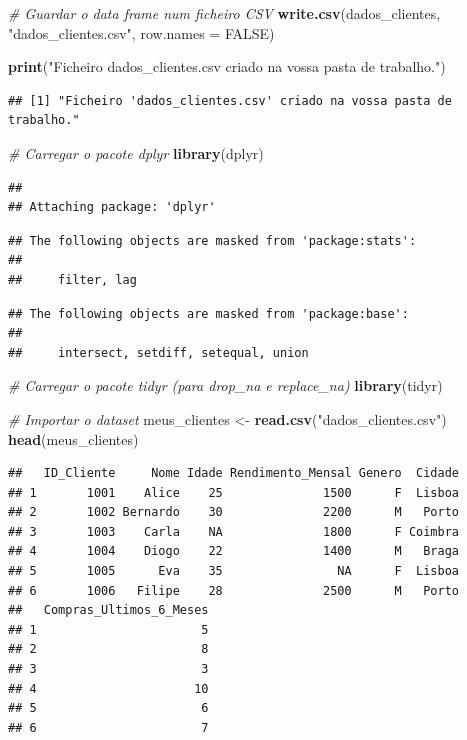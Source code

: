 \documentclass[
]{article}
\newenvironment{Shaded}{\begin{snugshade}}{\end{snugshade}}
\newcommand{\AttributeTok}[1]{\textcolor[rgb]{0.13,0.29,0.53}{#1}}
\newcommand{\CommentTok}[1]{\textcolor[rgb]{0.56,0.35,0.01}{\textit{#1}}}
\newcommand{\ConstantTok}[1]{\textcolor[rgb]{0.56,0.35,0.01}{#1}}
\newcommand{\FunctionTok}[1]{\textcolor[rgb]{0.13,0.29,0.53}{\textbf{#1}}}
\newcommand{\NormalTok}[1]{#1}
\newcommand{\OtherTok}[1]{\textcolor[rgb]{0.56,0.35,0.01}{#1}}
\newcommand{\StringTok}[1]{\textcolor[rgb]{0.31,0.60,0.02}{#1}}
\begin{document}
\begin{Shaded}
\begin{Highlighting}[]
\CommentTok{\# Guardar o data frame num ficheiro CSV}
\FunctionTok{write.csv}\NormalTok{(dados\_clientes, }\StringTok{"dados\_clientes.csv"}\NormalTok{, }\AttributeTok{row.names =} \ConstantTok{FALSE}\NormalTok{)}

\FunctionTok{print}\NormalTok{(}\StringTok{"Ficheiro \textquotesingle{}dados\_clientes.csv\textquotesingle{} criado na vossa pasta de trabalho."}\NormalTok{)}
\end{Highlighting}
\end{Shaded}

\begin{verbatim}
## [1] "Ficheiro 'dados_clientes.csv' criado na vossa pasta de trabalho."
\end{verbatim}

\begin{Shaded}
\begin{Highlighting}[]
\CommentTok{\# Carregar o pacote dplyr}
\FunctionTok{library}\NormalTok{(dplyr)}
\end{Highlighting}
\end{Shaded}

\begin{verbatim}
## 
## Attaching package: 'dplyr'
\end{verbatim}

\begin{verbatim}
## The following objects are masked from 'package:stats':
## 
##     filter, lag
\end{verbatim}

\begin{verbatim}
## The following objects are masked from 'package:base':
## 
##     intersect, setdiff, setequal, union
\end{verbatim}

\begin{Shaded}
\begin{Highlighting}[]
\CommentTok{\# Carregar o pacote tidyr (para drop\_na e replace\_na)}
\FunctionTok{library}\NormalTok{(tidyr)}

\CommentTok{\# Importar o dataset}
\NormalTok{meus\_clientes }\OtherTok{\textless{}{-}} \FunctionTok{read.csv}\NormalTok{(}\StringTok{"dados\_clientes.csv"}\NormalTok{)}
\FunctionTok{head}\NormalTok{(meus\_clientes)}
\end{Highlighting}
\end{Shaded}

\begin{verbatim}
##   ID_Cliente     Nome Idade Rendimento_Mensal Genero  Cidade
## 1       1001    Alice    25              1500      F  Lisboa
## 2       1002 Bernardo    30              2200      M   Porto
## 3       1003    Carla    NA              1800      F Coimbra
## 4       1004    Diogo    22              1400      M   Braga
## 5       1005      Eva    35                NA      F  Lisboa
## 6       1006   Filipe    28              2500      M   Porto
##   Compras_Ultimos_6_Meses
## 1                       5
## 2                       8
## 3                       3
## 4                      10
## 5                       6
## 6                       7
\end{verbatim}
\end{document}
